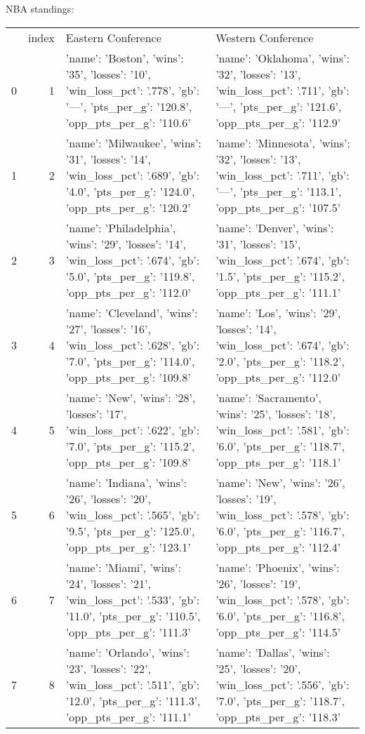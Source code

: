 NBA standings:
\begin{tabular}{lrll}
 & index & Eastern Conference & Western Conference \\
0 & 1 & {'name': 'Boston', 'wins': '35', 'losses': '10', 'win_loss_pct': '.778', 'gb': '—', 'pts_per_g': '120.8', 'opp_pts_per_g': '110.6'} & {'name': 'Oklahoma', 'wins': '32', 'losses': '13', 'win_loss_pct': '.711', 'gb': '—', 'pts_per_g': '121.6', 'opp_pts_per_g': '112.9'} \\
1 & 2 & {'name': 'Milwaukee', 'wins': '31', 'losses': '14', 'win_loss_pct': '.689', 'gb': '4.0', 'pts_per_g': '124.0', 'opp_pts_per_g': '120.2'} & {'name': 'Minnesota', 'wins': '32', 'losses': '13', 'win_loss_pct': '.711', 'gb': '—', 'pts_per_g': '113.1', 'opp_pts_per_g': '107.5'} \\
2 & 3 & {'name': 'Philadelphia', 'wins': '29', 'losses': '14', 'win_loss_pct': '.674', 'gb': '5.0', 'pts_per_g': '119.8', 'opp_pts_per_g': '112.0'} & {'name': 'Denver', 'wins': '31', 'losses': '15', 'win_loss_pct': '.674', 'gb': '1.5', 'pts_per_g': '115.2', 'opp_pts_per_g': '111.1'} \\
3 & 4 & {'name': 'Cleveland', 'wins': '27', 'losses': '16', 'win_loss_pct': '.628', 'gb': '7.0', 'pts_per_g': '114.0', 'opp_pts_per_g': '109.8'} & {'name': 'Los', 'wins': '29', 'losses': '14', 'win_loss_pct': '.674', 'gb': '2.0', 'pts_per_g': '118.2', 'opp_pts_per_g': '112.0'} \\
4 & 5 & {'name': 'New', 'wins': '28', 'losses': '17', 'win_loss_pct': '.622', 'gb': '7.0', 'pts_per_g': '115.2', 'opp_pts_per_g': '109.8'} & {'name': 'Sacramento', 'wins': '25', 'losses': '18', 'win_loss_pct': '.581', 'gb': '6.0', 'pts_per_g': '118.7', 'opp_pts_per_g': '118.1'} \\
5 & 6 & {'name': 'Indiana', 'wins': '26', 'losses': '20', 'win_loss_pct': '.565', 'gb': '9.5', 'pts_per_g': '125.0', 'opp_pts_per_g': '123.1'} & {'name': 'New', 'wins': '26', 'losses': '19', 'win_loss_pct': '.578', 'gb': '6.0', 'pts_per_g': '116.7', 'opp_pts_per_g': '112.4'} \\
6 & 7 & {'name': 'Miami', 'wins': '24', 'losses': '21', 'win_loss_pct': '.533', 'gb': '11.0', 'pts_per_g': '110.5', 'opp_pts_per_g': '111.3'} & {'name': 'Phoenix', 'wins': '26', 'losses': '19', 'win_loss_pct': '.578', 'gb': '6.0', 'pts_per_g': '116.8', 'opp_pts_per_g': '114.5'} \\
7 & 8 & {'name': 'Orlando', 'wins': '23', 'losses': '22', 'win_loss_pct': '.511', 'gb': '12.0', 'pts_per_g': '111.3', 'opp_pts_per_g': '111.1'} & {'name': 'Dallas', 'wins': '25', 'losses': '20', 'win_loss_pct': '.556', 'gb': '7.0', 'pts_per_g': '118.7', 'opp_pts_per_g': '118.3'} \\

\end{tabular}
